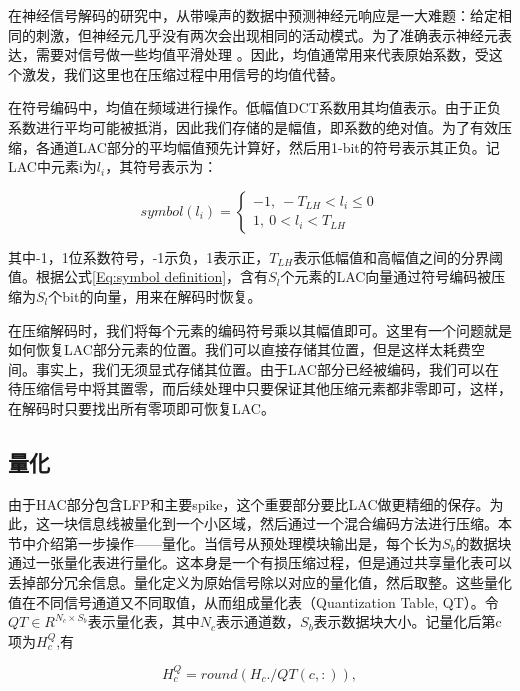 在神经信号解码的研究中，从带噪声的数据中预测神经元响应是一大难题：给定相同的刺激，但神经元几乎没有两次会出现相同的活动模式。为了准确表示神经元表达，需要对信号做一些均值平滑处理 \cite{31}。因此，均值通常用来代表原始系数，受这个激发，我们这里也在压缩过程中用信号的均值代替。

在符号编码中，均值在频域进行操作。低幅值DCT系数用其均值表示。由于正负系数进行平均可能被抵消，因此我们存储的是幅值，即系数的绝对值。为了有效压缩，各通道LAC部分的平均幅值预先计算好，然后用1-bit的符号表示其正负。记LAC中元素i为$l_i$，其符号表示为：

\begin{equation}\label{Eq:symbol definition}
  symbol(l_i)=\left\{
    \begin{array}{lr}
        -1,\ -T_{LH}<l_i\leq 0\\
        1,\ 0<l_i<T_{LH}
    \end{array}
  \right.
\end{equation}

其中-1，1位系数符号，-1示负，1表示正，$T_{LH}$表示低幅值和高幅值之间的分界阈值。根据公式\ref{Eq:symbol definition}，含有$S_l$个元素的LAC向量通过符号编码被压缩为$S_l$个bit的向量，用来在解码时恢复。

在压缩解码时，我们将每个元素的编码符号乘以其幅值即可。这里有一个问题就是如何恢复LAC部分元素的位置。我们可以直接存储其位置，但是这样太耗费空间。事实上，我们无须显式存储其位置。由于LAC部分已经被编码，我们可以在待压缩信号中将其置零，而后续处理中只要保证其他压缩元素都非零即可，这样，在解码时只要找出所有零项即可恢复LAC。



\subsection{量化}
由于HAC部分包含LFP和主要spike，这个重要部分要比LAC做更精细的保存。为此，这一块信息线被量化到一个小区域，然后通过一个混合编码方法进行压缩。本节中介绍第一步操作——量化。当信号从预处理模块输出是，每个长为$S_b$的数据块通过一张量化表进行量化。这本身是一个有损压缩过程，但是通过共享量化表可以丢掉部分冗余信息。量化定义为原始信号除以对应的量化值，然后取整。这些量化值在不同信号通道又不同取值，从而组成量化表（Quantization Table, QT）。令$QT\in R^{N_c\times S_b}$表示量化表，其中$N_c$表示通道数，$S_b$表示数据块大小。记量化后第c项为$H_c^Q$,有

\begin{equation}\label{Eq:Quantization Step}
  H_c^Q=round(H_c./QT(c,:)),
\end{equation}

